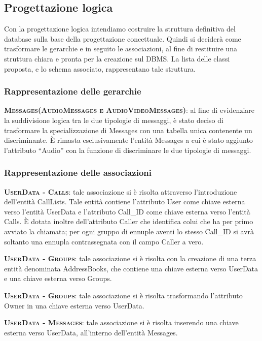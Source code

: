 \subsection{Progettazione logica}
Con la progettazione logica intendiamo costruire la struttura definitiva del database sulla base della progettazione concettuale. Quindi si deciderà come trasformare le gerarchie e in seguito le associazioni, al fine di restituire una struttura chiara e pronta per la creazione sul DBMS\@. La lista delle classi proposta, e lo schema associato, rappresentano tale struttura.

\subsubsection{Rappresentazione delle gerarchie}

\begin{description}
	\item{\scshape\bfseries Messages(AudioMessages e AudioVideoMessages)}: al fine di evidenziare la suddivisione logica tra le due tipologie di messaggi, è stato deciso di trasformare la specializzazione di Messages con una tabella unica contenente un discriminante. È rimasta esclusivamente l'entità Messages a cui è stato aggiunto l'attributo ``Audio'' con la funzione di discriminare le due tipologie di messaggi.
\end{description}

\subsubsection{Rappresentazione delle associazioni}

\begin{description}
	\item{\scshape\bfseries UserData - Calls}: tale associazione si è risolta attraverso l'introduzione dell'entità CallLists. Tale entità contiene l'attributo User come chiave esterna verso l'entità UserData e l'attributo Call\_ID come chiave esterna verso l'entità Calls. È dotata inoltre dell'attributo Caller che identifica colui che ha per primo avviato la chiamata; per ogni gruppo di ennuple aventi lo stesso Call\_ID si avrà soltanto una ennupla contrassegnata con il campo Caller a vero.
	\item{\scshape\bfseries UserData - Groups}: tale associazione si è risolta con la creazione di una terza entità denominata AddressBooks, che contiene una chiave esterna verso UserData e una chiave esterna verso Groups.
	\item{\scshape\bfseries UserData - Groups}: tale associazione si è risolta trasformando l'attributo Owner in una chiave esterna verso UserData.
	\item{\scshape\bfseries UserData - Messages}: tale associazione si è risolta inserendo una chiave esterna verso UserData, all'interno dell'entità Messages.
\end{description}

